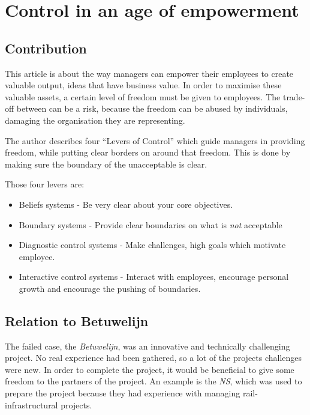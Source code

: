 \documentclass[]{uva-bachelor-thesis}
\title{\course}
\subtitle{\assignment}
\author{\group}
\begin{document}
\maketitle

\setlength{\parskip}{0px}
\tableofcontents
\setlength{\parskip}{.5em}

\clearpage

\chapter{Control in an age of empowerment \cite{simons1995control}}

\section{Contribution}
This article is about the way managers can empower their employees to create valuable output, ideas that have business value.
In order to maximise these valuable assets, a certain level of freedom must be given to employees. 
The trade-off between can be a risk, because the freedom can be abused by individuals, damaging the organisation they are representing.

The author describes four ``Levers of Control'' which guide managers in providing freedom, while putting clear borders on around that freedom.
This is done by making sure the boundary of the unacceptable is clear.

Those four levers are:
\begin{itemize}
  \item Beliefs systems - Be very clear about your core objectives.
  \item Boundary systems - Provide clear boundaries on what is \emph{not} acceptable
  \item Diagnostic control systems - Make challenges, high goals which motivate employee.
  \item Interactive control systems - Interact with employees, encourage personal growth and encourage the pushing of boundaries.
\end{itemize}

\section{Relation to Betuwelijn}
The failed case, the \emph{Betuwelijn}, was an innovative and technically challenging project.
No real experience had been gathered, so a lot of the projects challenges were new.
In order to complete the project, it would be beneficial to give some freedom to the partners of the project.
An example is the \emph{NS}, which was used to prepare the project because they had experience with managing rail-infrastructural projects.
\end{document}

